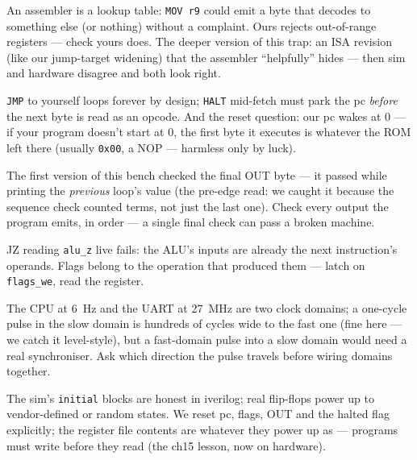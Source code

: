 \begin{tripwire}
An assembler is a lookup table: \texttt{MOV r9} could emit a byte
that decodes to something else (or nothing) without a complaint.
Ours rejects out-of-range registers --- check yours does. The deeper
version of this trap: an ISA revision (like our jump-target widening)
that the assembler ``helpfully'' hides --- then sim and hardware
disagree and both look right.
\end{tripwire}
\begin{tripwire}
\texttt{JMP} to yourself loops forever by design; \texttt{HALT}
mid-fetch must park the pc \emph{before} the next byte is read as an
opcode. And the reset question: our pc wakes at 0 --- if your program
doesn't start at 0, the first byte it executes is whatever the ROM
left there (usually \texttt{0x00}, a NOP --- harmless only by luck).
\end{tripwire}
\begin{tripwire}
The first version of this bench checked the final OUT byte --- it
passed while printing the \emph{previous} loop's value (the pre-edge
read: we caught it because the sequence check counted terms, not just
the last one). Check every output the program emits, in order ---
a single final check can pass a broken machine.
\end{tripwire}
\begin{tripwire}
JZ reading \texttt{alu\_z} live fails: the ALU's inputs are already
the next instruction's operands. Flags belong to the operation that
produced them --- latch on \texttt{flags\_we}, read the register.
\end{tripwire}
\begin{tripwire}
The CPU at 6~Hz and the UART at 27~MHz are two clock domains; a
one-cycle pulse in the slow domain is hundreds of cycles wide to the
fast one (fine here --- we catch it level-style), but a fast-domain
pulse into a slow domain would need a real synchroniser. Ask which
direction the pulse travels before wiring domains together.
\end{tripwire}
\begin{tripwire}
The sim's \texttt{initial} blocks are honest in iverilog; real
flip-flops power up to vendor-defined or random states. We reset pc,
flags, OUT and the halted flag explicitly; the register file contents
are whatever they power up as --- programs must write before they
read (the ch15 lesson, now on hardware).
\end{tripwire}

